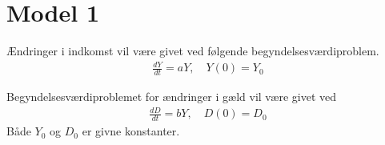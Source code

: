 \section{Model 1}


Ændringer i indkomst vil være givet ved følgende begyndelsesværdiproblem.
\begin{align}
    \frac{dY}{dt} = aY, \quad Y(0) = Y_0
\end{align}

Begyndelsesværdiproblemet for ændringer i gæld vil være givet ved
\begin{align}
    \frac{dD}{dt} = bY, \quad D(0) = D_0
\end{align}
Både $Y_0$ og $D_0$ er givne konstanter.
